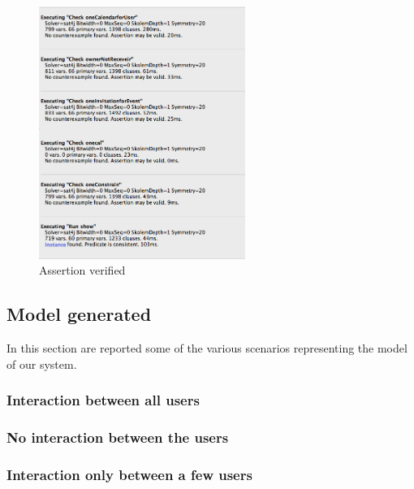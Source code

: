 \begin{center}
 \begin{figure}[H]
    \includegraphics[width=0.6\textwidth]{../Alloy/checkassert.png}
    \caption{Assertion verified}
     \label{fig:asser}
     \end{figure}
   \end{center} 
\doublespacing
\subsection{Model generated}
In this section are reported some of the various scenarios representing the model of our system.
\subsubsection{Interaction between all users}
\subsubsection{No interaction between the users}
\subsubsection{Interaction only between a few users}








